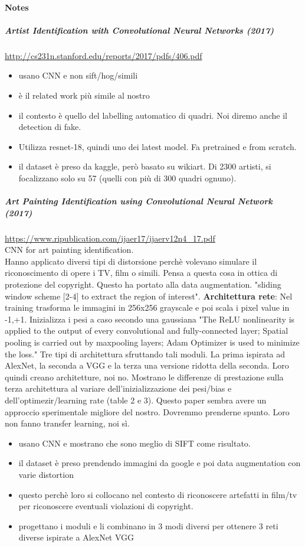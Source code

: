 \documentclass{article}
\begin{document}
\paragraph{Notes}
\subparagraph{Artist Identification with Convolutional Neural Networks (2017)}
\url{http://cs231n.stanford.edu/reports/2017/pdfs/406.pdf}\\
\begin{itemize}
	\item usano CNN e non sift/hog/simili
	\item è il related work più simile al nostro
	\item il contesto è quello del labelling automatico di quadri. Noi diremo anche il detection di fake.
	\item Utilizza resnet-18, quindi uno dei latest model. Fa pretrained e from scratch.
	\item il dataset è preso da kaggle, però basato su wikiart. Di 2300 artisti, si focalizzano solo su 57 (quelli con più di 300 quadri ognuno).
\end{itemize}
\subparagraph{Art Painting Identification using Convolutional Neural Network (2017)}
\url{https://www.ripublication.com/ijaer17/ijaerv12n4_17.pdf}\\
CNN for art painting identification.\\ Hanno applicato diversi tipi di distorsione perchè volevano simulare il riconoscimento di opere i TV, film o simili. Pensa a questa cosa in ottica di protezione del copyright. Questo ha portato alla data augmentation. "sliding window scheme [2-4] to extract the region of interest".
\textbf{Architettura rete}: Nel training trasforma le immagini in 256x256 grayscale e poi scala i pixel value in -1,+1.  Inizializza i pesi a caso secondo una gaussiana "The ReLU nonlinearity is applied to the output of every convolutional and
fully-connected layer; Spatial pooling is carried out by maxpooling layers; Adam Optimizer is used to minimize the loss." Tre tipi di architettura sfruttando tali moduli. La prima ispirata ad AlexNet, la seconda a VGG e la terza una versione ridotta della seconda. Loro quindi creano architetture, noi no.
Mostrano le differenze di prestazione sulla terza architettura al variare dell'inizializzazione dei pesi/bias e dell'optimezir/learning rate (table 2 e 3). Questo paper sembra avere un approccio sperimentale migliore del nostro. Dovremmo prenderne spunto. Loro non fanno transfer learning, noi sì.

\begin{itemize}
	\item usano CNN e mostrano che sono meglio di SIFT come risultato.
	\item il dataset è preso prendendo immagini da google e poi data augmentation con varie distortion
	\item questo perchè loro si collocano nel contesto di riconoscere artefatti in film/tv per riconoscere eventuali violazioni di copyright.
	\item progettano i moduli e li combinano in 3 modi diversi per ottenere 3 reti diverse ispirate a AlexNet  VGG
	
\end{itemize}
\end{document}
